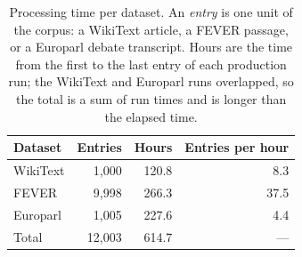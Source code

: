 \documentclass[11pt]{article}
\begin{document}
\begin{table}[h!]
\centering
\caption{Processing time per dataset. An \emph{entry} is one unit of the corpus: a WikiText article, a FEVER passage, or a Europarl debate transcript. Hours are the time from the first to the last entry of each production run; the WikiText and Europarl runs overlapped, so the total is a sum of run times and is longer than the elapsed time.}
\label{tabS:time}
\footnotesize
\begin{tabular*}{\textwidth}{@{\extracolsep{\fill}}lrrr}
\toprule
\textbf{Dataset} & \textbf{Entries} & \textbf{Hours} & \textbf{Entries per hour} \\
\midrule
WikiText & 1,000 & 120.8 & 8.3 \\
FEVER & 9,998 & 266.3 & 37.5 \\
Europarl & 1,005 & 227.6 & 4.4 \\
\midrule
Total & 12,003 & 614.7 & --- \\
\bottomrule
\end{tabular*}
\end{table}
\end{document}
